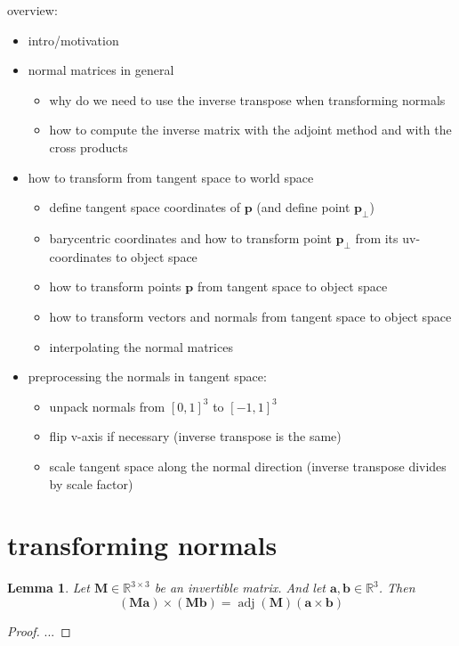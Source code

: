 \documentclass{article}
\newtheorem{lemma}{Lemma}
\newcommand{\R}{\mathbb{R}}
\newcommand{\vctr}[1]{\mathbf{#1}}
\newcommand{\point}[1]{\mathbf{#1}}
\newcommand{\mat}[1]{\mathbf{#1}}
\DeclareMathOperator{\adj}{adj}
\begin{document}
overview:
\begin{itemize}
 \item intro/motivation
 \item normal matrices in general
 \begin{itemize}
 \item why do we need to use the inverse transpose when transforming normals
 \item how to compute the inverse matrix with the adjoint method and with the cross products
 \end{itemize}
 \item how to transform from tangent space to world space
 \begin{itemize}
 \item define tangent space coordinates of \(\point{p}\) (and define point \(\point{p_\perp}\))
 \item barycentric coordinates and how to transform point \(\point{p_\perp}\) from its uv-coordinates to object space
 \item how to transform points \(\point{p}\) from tangent space to object space
 \item how to transform vectors and normals from tangent space to object space
 \item interpolating the normal matrices
 \end{itemize}
 \item preprocessing the normals in tangent space: 
 \begin{itemize}
  \item unpack normals from \([0, 1]^3\) to \([-1, 1]^3\)
  \item flip v-axis if necessary (inverse transpose is the same)
  \item scale tangent space along the normal direction (inverse transpose divides by scale factor)
 \end{itemize}

\end{itemize}


\section{transforming normals}

\begin{lemma}
Let \(\mat{M} \in \R^{3\times 3}\) be an invertible matrix. And let \(\vctr{a}, \vctr{b} \in \R^3\). Then
\[
(\mat{M}\vctr{a})\times(\mat{M}\vctr{b}) = \adj(\mat{M}) (\vctr{a} \times \vctr{b})
\]
\end{lemma}
\begin{proof}
 ...
\end{proof}
\end{document}
